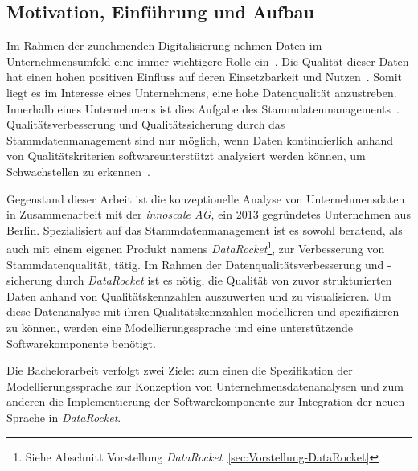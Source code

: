 \documentclass[
  language=german, %
  type=bachelor,%
  ngerman
]{isthesis}
\begin{document}
\begin{content}



  \chapter{Motivation, Einführung und Aufbau}\label{ch:einleitung}


  Im Rahmen der zunehmenden Digitalisierung nehmen Daten im Unternehmensumfeld
  eine immer wichtigere Rolle ein~\cite[][]{otto2016datenqualitat}. Die
  Qualität dieser Daten hat einen hohen positiven Einfluss auf deren
  Einsetzbarkeit und Nutzen~\cite[][]{naumann2007datenqualitat,
  helfert2000massnahmen}. Somit liegt es im Interesse eines Unternehmens, eine
  hohe Datenqualität anzustreben. Innerhalb eines Unternehmens ist dies Aufgabe
  des Stammdatenmanagements~\cite[][]{legner2007stammdaten}.
  Qualitätsverbesserung und Qualitätssicherung durch das Stammdatenmanagement
  sind nur möglich, wenn Daten kontinuierlich anhand von Qualitätskriterien
  softwareunterstützt analysiert werden können, um Schwachstellen zu
  erkennen~\cite[][S. 2]{baghi2013controlling}.

  Gegenstand dieser Arbeit ist die konzeptionelle Analyse von Unternehmensdaten
  in Zusammenarbeit mit der \textit{innoscale AG}, ein 2013 gegründetes
  Unternehmen aus Berlin.  Spezialisiert auf das Stammdatenmanagement ist es
  sowohl beratend, als auch mit einem eigenen Produkt namens
  \textit{DataRocket}\footnote{Siehe Abschnitt Vorstellung
  \textit{DataRocket}~\ref{sec:Vorstellung-DataRocket}}, zur Verbesserung von
  Stammdatenqualität, tätig. Im Rahmen der Datenqualitätsverbesserung und
  -sicherung durch \textit{DataRocket} ist es nötig, die Qualität von zuvor
  strukturierten Daten anhand von Qualitätskennzahlen auszuwerten und zu
  visualisieren. Um diese Datenanalyse mit ihren Qualitätskennzahlen
  modellieren und spezifizieren zu können, werden eine Modellierungssprache und
  eine unterstützende Softwarekomponente benötigt.

  Die Bachelorarbeit verfolgt zwei Ziele: zum einen die Spezifikation der
  Modellierungssprache zur Konzeption von Unternehmensdatenanalysen und zum
  anderen die Implementierung der Softwarekomponente zur Integration der neuen
  Sprache in \textit{DataRocket}.


\end{content}
\end{document}
